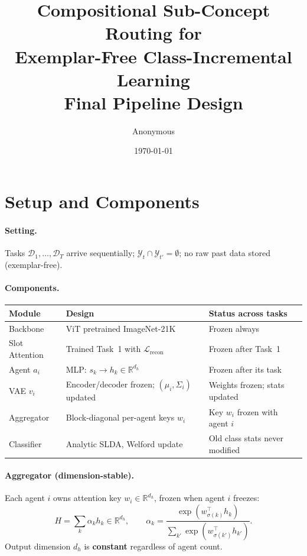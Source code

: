 \documentclass[11pt,a4paper]{article}
\title{\textbf{Compositional Sub-Concept Routing for\\
Exemplar-Free Class-Incremental Learning}\\[0.4em]
\large Final Pipeline Design}
\author{Anonymous}
\date{\today}
\newcommand{\Lcal}{\mathcal{L}}
\newcommand{\RR}{\mathbb{R}}
\begin{document}
\maketitle

\section{Setup and Components}

\paragraph{Setting.}
Tasks $\mathcal{D}_1,\ldots,\mathcal{D}_T$ arrive sequentially;
$\mathcal{Y}_t \cap \mathcal{Y}_{t'}=\emptyset$; no raw past data stored (exemplar-free).

\paragraph{Components.}
\begin{center}
\renewcommand{\arraystretch}{1.3}
\begin{tabular}{lll}
\toprule
\textbf{Module} & \textbf{Design} & \textbf{Status across tasks} \\
\midrule
Backbone & ViT pretrained ImageNet-21K & Frozen always \\
Slot Attention & Trained Task~1 with $\Lcal_{\text{recon}}$ & Frozen after Task~1 \\
Agent $a_i$ & MLP: $s_k \to h_k \in \RR^{d_h}$ & Frozen after its task \\
VAE $v_i$ & Encoder/decoder frozen; $(\mu_i,\Sigma_i)$ updated & Weights frozen; stats updated \\
Aggregator & Block-diagonal per-agent keys $w_i$ & Key $w_i$ frozen with agent $i$ \\
Classifier & Analytic SLDA, Welford update & Old class stats never modified \\
\bottomrule
\end{tabular}
\end{center}

\paragraph{Aggregator (dimension-stable).}
Each agent $i$ owns attention key $w_i \in \RR^{d_h}$, frozen when agent $i$ freezes:
\begin{equation}
  H = \sum_k \alpha_k h_k \in \RR^{d_h}, \qquad
  \alpha_k = \frac{\exp(w_{\sigma(k)}^\top h_k)}{\sum_{k'}\exp(w_{\sigma(k')}^\top h_{k'})}.
\end{equation}
Output dimension $d_h$ is \textbf{constant} regardless of agent count.
\end{document}
